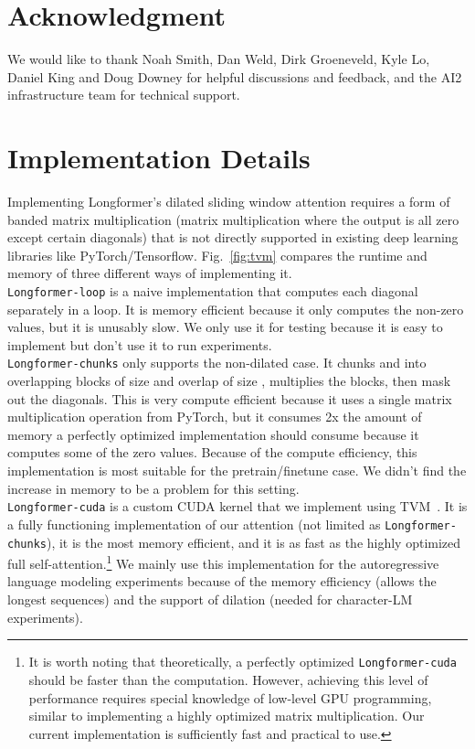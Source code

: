 \documentclass[11pt,a4paper]{article}
\newcommand{\model}{Longformer\xspace}
\begin{document}
\section*{Acknowledgment}
We would like to thank Noah Smith, Dan Weld, Dirk Groeneveld, Kyle Lo, Daniel King and Doug Downey for helpful discussions and feedback, and the AI2 infrastructure team for technical support. 



\clearpage

\appendix
\section{Implementation Details}
\label{sec:tvm_details}

Implementing \model's dilated sliding window attention requires a form
of banded matrix multiplication (matrix multiplication where the output
is all zero except certain diagonals) that is not directly supported in 
existing deep learning libraries like PyTorch/Tensorflow. 
Fig.~\ref{fig:tvm} compares the runtime and memory of three different ways of implementing
it. \\
\texttt{\model-loop} is a naive implementation that computes each diagonal separately in a loop. 
It is memory efficient because it only computes the non-zero values, but 
it is unusably slow. We only use it for testing because it is easy to implement but don't use 
it to run experiments. \\
\texttt{\model-chunks} only supports the non-dilated case. It chunks  and  into 
overlapping blocks of size  and overlap of size , multiplies the blocks, 
then mask out the diagonals. This is very compute efficient because it uses
a single matrix multiplication operation from PyTorch, but it consumes 2x the amount of memory
a perfectly optimized implementation should consume because it computes some of the zero values.
Because of the compute efficiency, this implementation is most suitable for the 
pretrain/finetune case. We didn't find the increase in memory to be a problem for this setting. \\
\texttt{\model-cuda} is a custom CUDA kernel that we implement using 
TVM~\cite{tvm}. It is a fully functioning implementation of our attention (not limited as \texttt{\model-chunks}), it is the most memory efficient, 
and it is as fast as the highly optimized full self-attention.\footnote{It is worth noting that theoretically, a perfectly optimized \texttt{\model-cuda} should be faster than the  computation. 
However, achieving this level of performance requires special knowledge of low-level GPU programming, similar to implementing a highly optimized matrix multiplication. Our current implementation is sufficiently fast and practical to use.} We mainly use this implementation for the 
autoregressive language modeling experiments because of the memory efficiency (allows the longest 
sequences) and the support of dilation (needed for character-LM experiments).
\end{document}
